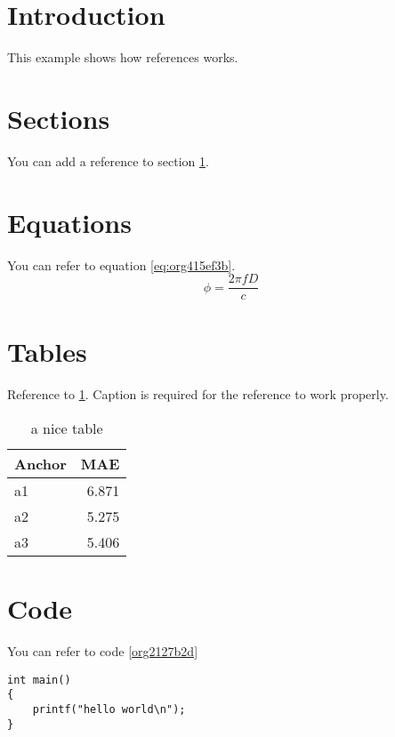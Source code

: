


\section{Introduction}
\label{sec:org7f5f05b}
This example shows how references works.

\section{Sections}
\label{sec:org412c0bb}
You can add a reference to section \ref{sec:org7f5f05b}.

\section{Equations}
\label{sec:orgbd988d1}
You can refer to equation \ref{eq:org415ef3b}.
\begin{equation}
\label{eq:org415ef3b}
\phi = \frac{2\pi fD}{c}
\end{equation}

\section{Tables}
\label{sec:orgc488be2}
Reference to \ref{tab:org55a125d}.
Caption is required for the reference to work properly.

\begin{table}[htbp]
\caption{\label{tab:org55a125d}
a nice table}
\centering
\begin{tabular}{lr}
Anchor & MAE\\
\hline
a1 & 6.871\\
a2 & 5.275\\
a3 & 5.406\\
\end{tabular}
\end{table}

\section{Code}
\label{sec:orgb33dfda}
You can refer to code \ref{org2127b2d}

\begin{verbatim}
int main()
{
    printf("hello world\n");
}
\end{verbatim}


